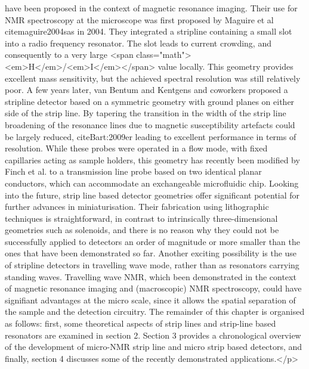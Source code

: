 have been proposed in the context of magnetic resonance imaging. Their use for NMR spectroscopy at the microscope was first proposed by Maguire et al cite{maguire2004sas} in 2004. They integrated a stripline containing a small slot into a radio frequency resonator. The slot leads to current crowding, and consequently to a very large <span class="math"><em>H</em>/<em>I</em></span> value locally. This geometry provides excellent mass sensitivity, but the achieved spectral resolution was still relatively poor. A few years later, van Bentum and Kentgens and coworkers proposed a stripline detector based on a symmetric geometry with ground planes on either side of the strip line. By tapering the transition in the width of the strip line broadening of the resonance lines due to magnetic susceptibility artefacts could be largely reduced, cite{Bart:2009er} leading to excellent performance in terms of resolution. While these probes were operated in a flow mode, with fixed capillaries acting as sample holders, this geometry has recently been modified by Finch et al. to a transmission line probe based on two identical planar conductors, which can accommodate an exchangeable microfluidic chip. Looking into the future, strip line based detector geometries offer significant potential for further advances in miniaturisation. Their fabrication using lithographic techniques is straightforward, in contrast to intrinsically three-dimensional geometries such as solenoids, and there is no reason why they could not be successfully applied to detectors an order of magnitude or more smaller than the ones that have been demonstrated so far. Another exciting possibility is the use of stripline detectors in travelling wave mode, rather than as resonators carrying standing waves. Travelling wave NMR, which been demonstrated in the context of magnetic resonance imaging and (macroscopic) NMR spectroscopy, could have signifiant advantages at the micro scale, since it allows the spatial separation of the sample and the detection circuitry. The remainder of this chapter is organised as follows: first, some theoretical aspects of strip lines and strip-line based resonators are examined in section 2. Section 3 provides a chronological overview of the development of micro-NMR strip line and micro strip based detectors, and finally, section 4 discusses some of the recently demonstrated applications.</p>
